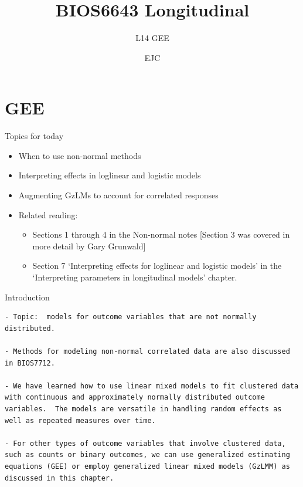 \documentclass[
  9pt,
  ignorenonframetext,
]{beamer}
\title{BIOS6643 Longitudinal}
\subtitle{L14 GEE}
\author{EJC}
\date{}
\institute{Department of Biostatistics \& Informatics}
\begin{document}
\frame{\titlepage}

\begin{frame}[allowframebreaks]
  \tableofcontents[hideallsubsections]
\end{frame}
\hypertarget{gee}{%
\section{GEE}\label{gee}}

\begin{frame}{Topics for today}
\protect\hypertarget{topics-for-today}{}
\begin{itemize}
\item
  When to use non-normal methods
\item
  Interpreting effects in loglinear and logistic models
\item
  Augmenting GzLMs to account for correlated responses
\item
  Related reading:

  \begin{itemize}
  \item
    Sections 1 through 4 in the Non-normal notes {[}Section 3 was
    covered in more detail by Gary Grunwald{]}
  \item
    Section 7 `Interpreting effects for loglinear and logistic models'
    in the `Interpreting parameters in longitudinal models' chapter.
  \end{itemize}
\end{itemize}
\end{frame}

\begin{frame}[fragile]{Introduction}
\protect\hypertarget{introduction}{}
\begin{verbatim}
- Topic:  models for outcome variables that are not normally distributed.

- Methods for modeling non-normal correlated data are also discussed in BIOS7712.  

- We have learned how to use linear mixed models to fit clustered data with continuous and approximately normally distributed outcome variables.  The models are versatile in handling random effects as well as repeated measures over time.  

- For other types of outcome variables that involve clustered data, such as counts or binary outcomes, we can use generalized estimating equations (GEE) or employ generalized linear mixed models (GzLMM) as discussed in this chapter.
\end{verbatim}
\end{frame}
\end{document}
